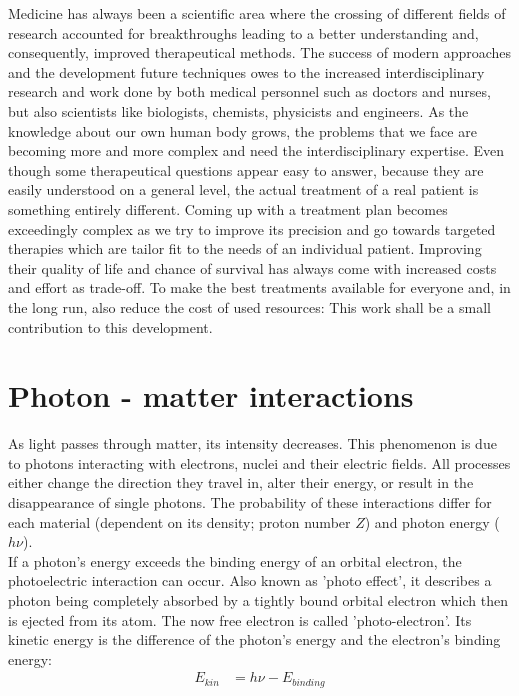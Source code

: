 Medicine has always been a scientific area where the crossing of different fields of research accounted for breakthroughs leading to a better understanding and, consequently, improved therapeutical methods.
The success of modern approaches and the development future techniques owes to the increased interdisciplinary research and work done by both medical personnel such as doctors and nurses, but also scientists like biologists, chemists, physicists and engineers.
As the knowledge about our own human body grows, the problems that we face are becoming more and more complex and need the interdisciplinary expertise.
Even though some therapeutical questions appear easy to answer, because they are easily understood on a general level, the actual treatment of a real patient is something entirely different.
Coming up with a treatment plan becomes exceedingly complex as we try to improve its precision and go towards targeted therapies which are tailor fit to the needs of an individual patient.
Improving their quality of life and chance of survival has always come with increased costs and effort as trade-off.
To make the best treatments available for everyone and, in the long run, also reduce the cost of used resources:
This work shall be a small contribution to this development.
\newpage

\section{Photon - matter interactions}
\label{sec:photon}

As light passes through matter, its intensity decreases.
This phenomenon is due to photons interacting with electrons, nuclei and their electric fields.
All processes either change the direction they travel in, alter their energy, or result in the disappearance of single photons.
The probability of these interactions differ for each material (dependent on its density; proton number $Z$) and photon energy ($h\nu$). \\

If a photon's energy exceeds the binding energy of an orbital electron, the photoelectric interaction can occur.
Also known as 'photo effect', it describes a photon being completely absorbed by a tightly bound orbital electron which then is ejected from its atom.
The now free electron is called 'photo-electron'. Its kinetic energy is the difference of the photon's energy and the electron's binding energy:
\begin{align}
E_{kin} &= h\nu - E_{binding}
\end{align} \\

